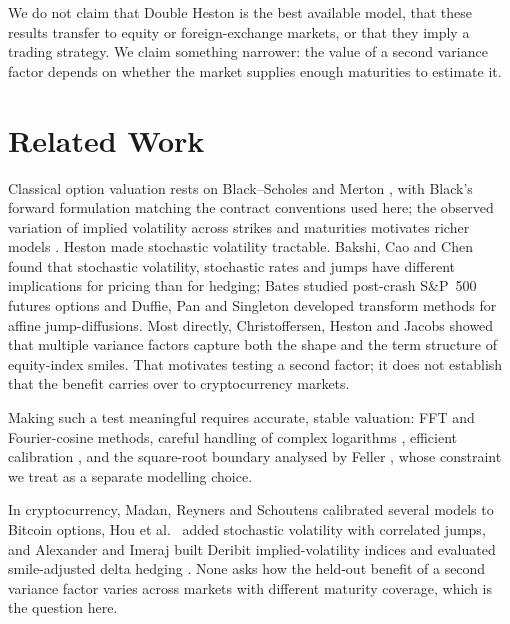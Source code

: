\documentclass[runningheads]{llncs}
\begin{document}
We do not claim that Double Heston is the best available model, that these
results transfer to equity or foreign-exchange markets, or that they imply a
trading strategy. We claim something narrower: the value of a second variance
factor depends on whether the market supplies enough maturities to estimate it.

\section{Related Work}

Classical option valuation rests on Black--Scholes \cite{black1973} and
Merton \cite{merton1973}, with Black's forward formulation \cite{black1976}
matching the contract conventions used here; the observed variation of implied
volatility across strikes and maturities motivates richer models
\cite{gatheral2006}. Heston \cite{heston1993} made stochastic volatility
tractable. Bakshi, Cao and Chen \cite{bakshi1997} found that stochastic
volatility, stochastic rates and jumps have different implications for pricing
than for hedging; Bates \cite{bates2000} studied post-crash S\&P~500 futures
options and Duffie, Pan and Singleton \cite{duffie2000} developed transform
methods for affine jump-diffusions. Most directly, Christoffersen, Heston and
Jacobs \cite{chj2009} showed that multiple variance factors capture both the
shape and the term structure of equity-index smiles. That motivates testing a
second factor; it does not establish that the benefit carries over to
cryptocurrency markets.

Making such a test meaningful requires accurate, stable valuation: FFT
\cite{carr1999} and Fourier-cosine \cite{fang2008} methods, careful handling of
complex logarithms \cite{lord2010}, efficient calibration \cite{cui2017}, and
the square-root boundary analysed by Feller \cite{feller1951}, whose constraint
we treat as a separate modelling choice.

In cryptocurrency, Madan, Reyners and Schoutens \cite{madan2019} calibrated
several models to Bitcoin options, Hou et al.\ \cite{hou2020} added stochastic
volatility with correlated jumps, and Alexander and Imeraj built Deribit
implied-volatility indices \cite{alexander2021} and evaluated smile-adjusted
delta hedging \cite{alexander2023}. None asks how the held-out benefit of a
second variance factor varies across markets with different maturity coverage,
which is the question here.
\end{document}
